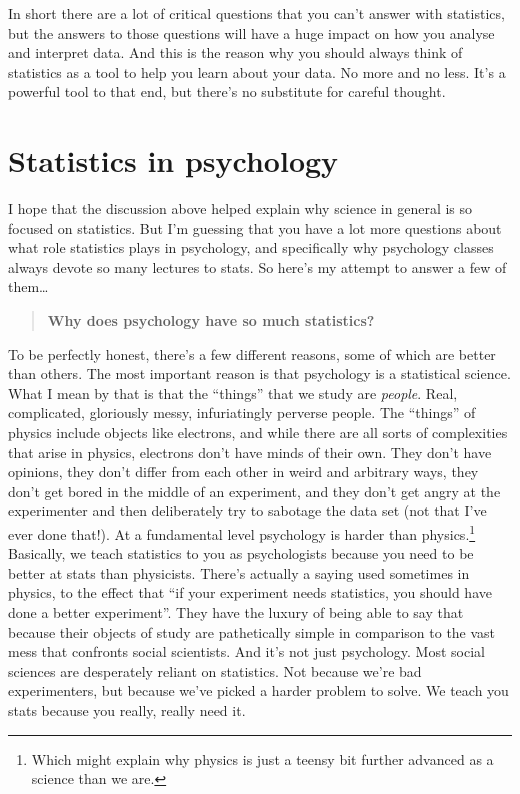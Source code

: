 \documentclass[
  a4paper,
]{book}
\begin{document}
In short there are a lot of critical questions that you can't answer
with statistics, but the answers to those questions will have a huge
impact on how you analyse and interpret data. And this is the reason why
you should always think of statistics as a tool to help you learn about
your data. No more and no less. It's a powerful tool to that end, but
there's no substitute for careful thought.

\hypertarget{statistics-in-psychology}{%
\section{Statistics in psychology}\label{statistics-in-psychology}}

I hope that the discussion above helped explain why science in general
is so focused on statistics. But I'm guessing that you have a lot more
questions about what role statistics plays in psychology, and
specifically why psychology classes always devote so many lectures to
stats. So here's my attempt to answer a few of them\ldots{}

\begin{quote}
\textbf{Why does psychology have so much statistics?}
\end{quote}

To be perfectly honest, there's a few different reasons, some of which
are better than others. The most important reason is that psychology is
a statistical science. What I mean by that is that the ``things'' that
we study are \emph{people}. Real, complicated, gloriously messy,
infuriatingly perverse people. The ``things'' of physics include objects
like electrons, and while there are all sorts of complexities that arise
in physics, electrons don't have minds of their own. They don't have
opinions, they don't differ from each other in weird and arbitrary ways,
they don't get bored in the middle of an experiment, and they don't get
angry at the experimenter and then deliberately try to sabotage the data
set (not that I've ever done that!). At a fundamental level psychology
is harder than physics.\footnote{Which might explain why physics is just
  a teensy bit further advanced as a science than we are.} Basically, we
teach statistics to you as psychologists because you need to be better
at stats than physicists. There's actually a saying used sometimes in
physics, to the effect that ``if your experiment needs statistics, you
should have done a better experiment''. They have the luxury of being
able to say that because their objects of study are pathetically simple
in comparison to the vast mess that confronts social scientists. And
it's not just psychology. Most social sciences are desperately reliant
on statistics. Not because we're bad experimenters, but because we've
picked a harder problem to solve. We teach you stats because you really,
really need it.
\end{document}
